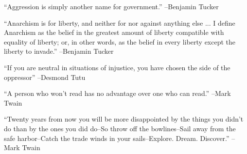 \documentclass{article}%
\begin{document}
\linebreak%
\vspace{1mm}%
\begin{minipage}{\textwidth}%
\flushleft%
“Aggression is simply another name for government.”%
\linebreak%
\vspace{1mm}%
–Benjamin Tucker%
\linebreak%
\vspace{1mm}%
\end{minipage}%
\linebreak%
\vspace{1mm}%
\begin{minipage}{\textwidth}%
\flushleft%
“Anarchism is for liberty, and neither for nor against anything else ... I define Anarchism as the belief in the greatest amount of liberty compatible with equality of liberty; or, in other words, as the belief in every liberty except the liberty to invade.”%
\linebreak%
\vspace{1mm}%
–Benjamin Tucker%
\linebreak%
\vspace{1mm}%
\end{minipage}%
\linebreak%
\vspace{1mm}%
\begin{minipage}{\textwidth}%
\flushleft%
“If you are neutral in situations of injustice, you have chosen the side of the oppressor”%
\linebreak%
\vspace{1mm}%
–Desmond Tutu%
\linebreak%
\vspace{1mm}%
\end{minipage}%
\linebreak%
\vspace{1mm}%
\begin{minipage}{\textwidth}%
\flushleft%
“A person who won't read has no advantage over one who can read.”%
\linebreak%
\vspace{1mm}%
–Mark Twain%
\linebreak%
\vspace{1mm}%
\end{minipage}%
\linebreak%
\vspace{1mm}%
\begin{minipage}{\textwidth}%
\flushleft%
“Twenty years from now you will be more disappointed by the things you didn't do than by the ones you did do–So throw off the bowlines–Sail away from the safe harbor–Catch the trade winds in your sails–Explore. Dream. Discover.”%
\linebreak%
\vspace{1mm}%
–Mark Twain%
\linebreak%
\vspace{1mm}%
\end{minipage}%
\end{document}
